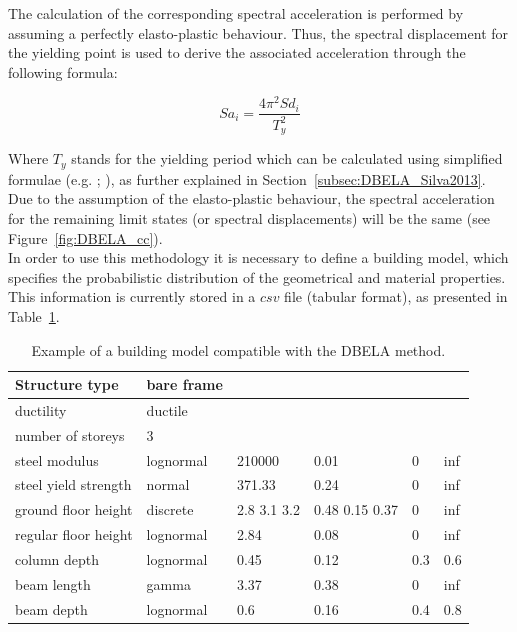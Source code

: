 The calculation of the corresponding spectral acceleration is performed by assuming a perfectly elasto-plastic behaviour. Thus, the spectral displacement for the yielding point is used to derive the associated acceleration through the following formula:

\begin{equation}
Sa_i = \frac{4\pi^2Sd_i}{T_y^2}
\end{equation}

Where $T_y$ stands for the yielding period which can be calculated using simplified formulae (e.g. \cite{CrowleyPinho2004}; \cite{CrowleyPinho2006}), as further explained in Section~\ref{subsec:DBELA_Silva2013}. Due to the assumption of the elasto-plastic behaviour, the spectral acceleration for the remaining limit states (or spectral displacements) will be the same (see Figure~\ref{fig:DBELA_cc}).\\

In order to use this methodology it is necessary to define a building model, which specifies the probabilistic distribution of the geometrical and material properties. This information is currently stored in a $csv$ file (tabular format), as presented in Table~\ref{table:building_model}.

\begin {table}[htb]
\caption{Example of a building model compatible with the DBELA method.}
\label{table:building_model}
\begin{center}
  \begin{tabular}{ | l | l | l | l | l | l |}
  \hline
Structure type & bare frame &  &  &  &  \\ \hline
ductility & ductile &  &  &  &  \\ \hline
number of storeys & 3 &  &  &  &  \\ \hline
steel modulus & lognormal & 210000 & 0.01 & 0 & inf \\ \hline
steel yield strength & normal & 371.33 & 0.24 & 0 & inf \\ \hline
ground floor height & discrete & 2.8 3.1 3.2 & 0.48 0.15 0.37 & 0 & inf \\ \hline
regular floor height & lognormal & 2.84 & 0.08 & 0 & inf \\ \hline
column depth & lognormal & 0.45 & 0.12 & 0.3 & 0.6 \\ \hline
beam length & gamma & 3.37 & 0.38 & 0 & inf \\ \hline
beam depth & lognormal & 0.6 & 0.16 & 0.4 & 0.8 \\ \hline
  \end{tabular}
\end{center}
\end{table}

